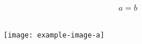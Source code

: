 \documentclass{beamer}
\begin{document}
\begin{frame}
\begin{equation}
a=b
\end{equation}\\
\begin{figure}
  \texttt{[image: example-image-a]}
  \caption{}
  \label{somefig}
  \end{figure}
\end{frame}
\end{document}

